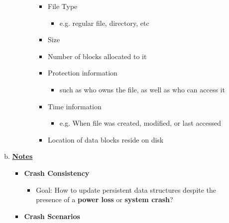 \documentclass[12pt]{article}
\begin{document}
\begin{enumerate}[1.]
\begin{enumerate}[a)]
\begin{itemize}
\begin{itemize}
                \begin{itemize}
                    \item File Type
                    \begin{itemize}
                        \item e.g. regular file, directory, etc
                    \end{itemize}
                    \item Size
                    \item Number of blocks allocated to it
                    \item Protection information
                    \begin{itemize}
                        \item such as who owns the file, as well as who can access it
                    \end{itemize}
                    \item Time information
                    \begin{itemize}
                        \item e.g. When file was created, modified, or last accessed
                    \end{itemize}
                    \item Location of data blocks reside on disk
                \end{itemize}
            \end{itemize}
        \end{itemize}

        \item

        \bigskip

        \underline{\textbf{Notes}}

        \begin{itemize}
            \item \textbf{Crash Consistency}

            \begin{itemize}
                \item Goal: How to update persistent data structures despite the presence of
                a \textbf{power loss} or \textbf{system crash}?
            \end{itemize}

            \item \textbf{Crash Scenarios}


\end{itemize}
\end{enumerate}
\end{enumerate}
\end{document}
